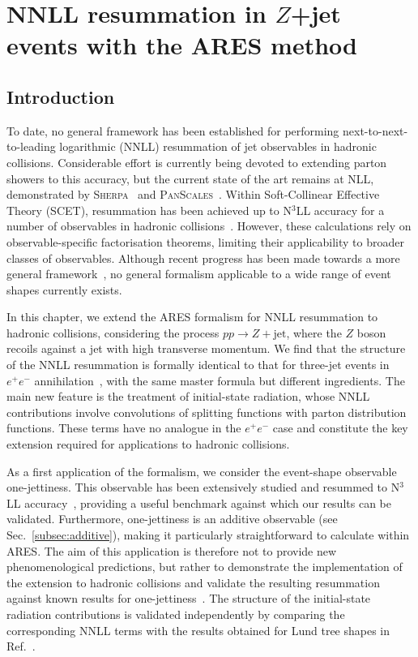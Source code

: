 \chapter{NNLL resummation in $Z$+jet events with the ARES method}
\label{ch:hhZjet}

\section{Introduction}
\label{sec:intro}

To date, no general framework has been established for performing
next-to-next-to-leading logarithmic (NNLL) resummation of jet
observables in hadronic collisions. Considerable effort is currently 
being devoted to extending parton showers
to this accuracy, but the current state of the art remains at NLL,
demonstrated by \textsc{Sherpa}~\cite{Herren:2022jej,Sherpa:2024mfk}
and \textsc{PanScales}~\cite{vanBeekveld:2022zhl,vanBeekveld:2022ukn,
vanBeekveld:2023chs}. Within Soft-Collinear Effective Theory (SCET),
resummation has been achieved up to N$^3$LL accuracy for a number of
observables in hadronic collisions~\cite{Becher:2008cf, Abbate:2010xh, Alioli:2023rxx}. However, these calculations rely on
observable-specific factorisation theorems, limiting their applicability
to broader classes of observables. Although recent progress has been made
towards a more general framework~\cite{vanBeekveld:2025zjh}, no general formalism applicable to a
wide range of event shapes currently exists.

In this chapter, we extend the \textsc{ARES} formalism for
NNLL resummation to hadronic collisions, considering the process $pp\to Z+\text{jet}$, 
where the $Z$ boson recoils against a jet with high transverse momentum. We
find that the structure of the NNLL resummation is formally identical
to that for three-jet events in $e^+e^-$ annihilation~\cite{Arpino:2019ozn}, with the same
master formula but different ingredients. The main new feature is the
treatment of initial-state radiation, whose NNLL contributions involve
convolutions of splitting functions with parton distribution functions.
These terms have no analogue in the $e^+e^-$ case and constitute the key
extension required for applications to hadronic collisions.

As a first application of the formalism, we consider the event-shape
observable one-jettiness. This observable has been extensively studied
and resummed to N$^3$LL accuracy~\cite{Alioli:2023rxx}, providing a
useful benchmark against which our results can be validated.
Furthermore, one-jettiness is an additive observable
(see Sec.~\ref{subsec:additive}), making it particularly straightforward
to calculate within \textsc{ARES}. The aim of this
application is therefore not to provide new phenomenological
predictions, but rather to demonstrate the implementation of the
extension to hadronic collisions and validate the resulting resummation
against known results for one-jettiness~\cite{Gaunt:2015pea}.
The structure of the initial-state radiation contributions is validated independently by comparing
the corresponding NNLL terms with the results obtained for Lund tree shapes
in Ref.~\cite{vanBeekveld:2025zjh}.

